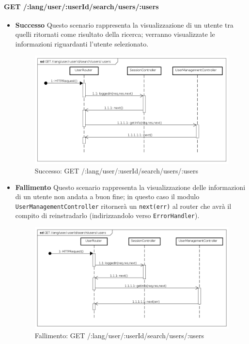 





\paragraph{GET /:lang/user/:userId/search/users/:users}
\begin{itemize}
\item \textbf{Successo}
Questo scenario rappresenta la visualizzazione di un utente tra quelli ritornati come risultato della ricerca; verranno visualizzate le informazioni riguardanti l'utente selezionato.

\begin{figure}[ht]
	\centering
	\includegraphics[scale=0.45]{UML/DiagrammiDiSequenza/Back-end/GET__lang_user__userId_search_users__users_success.png}
	\caption{Successo: GET /:lang/user/:userId/search/users/:users}
\end{figure}
\FloatBarrier

\item \textbf{Fallimento}
Questo scenario rappresenta la visualizzazione delle informazioni di un utente non andata a buon fine; in questo caso il modulo \texttt{UserManagementController} ritornerà un \texttt{next(err)} al router che avrà il compito di reinstradarlo (indirizzandolo verso \texttt{ErrorHandler}).

\begin{figure}[ht]
	\centering
	\includegraphics[scale=0.45]{UML/DiagrammiDiSequenza/Back-end/GET__lang_user__userId_search_users__users_failure.png}
	\caption{Fallimento: GET /:lang/user/:userId/search/users/:users}
\end{figure}
\FloatBarrier

\end{itemize}





